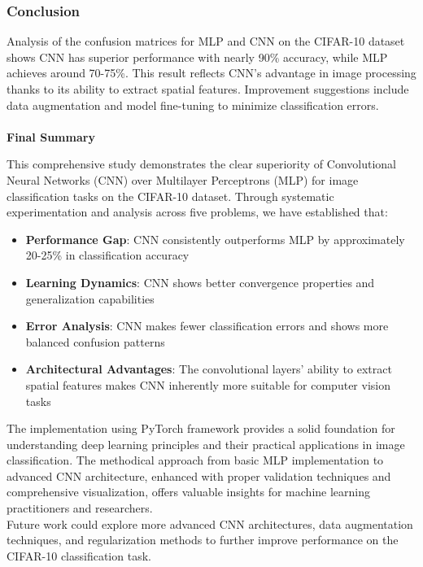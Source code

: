 \documentclass[12pt]{article}
\begin{document}
\subsubsection{Conclusion}

Analysis of the confusion matrices for MLP and CNN on the CIFAR-10 dataset shows 
CNN has superior performance with nearly 90\% accuracy, while MLP achieves around 
70-75\%. This result reflects CNN's advantage in image processing thanks to its 
ability to extract spatial features. Improvement suggestions include data 
augmentation and model fine-tuning to minimize classification errors.\\\\

\textbf{\Large{Final Summary}}

This comprehensive study demonstrates the clear superiority of Convolutional Neural 
Networks (CNN) over Multilayer Perceptrons (MLP) for image classification tasks on 
the CIFAR-10 dataset. Through systematic experimentation and analysis across five 
problems, we have established that:

\begin{itemize}
    \item \textbf{Performance Gap}: CNN consistently outperforms MLP by approximately 
    20-25\% in classification accuracy
    \item \textbf{Learning Dynamics}: CNN shows better convergence properties and 
    generalization capabilities
    \item \textbf{Error Analysis}: CNN makes fewer classification errors and shows 
    more balanced confusion patterns
    \item \textbf{Architectural Advantages}: The convolutional layers' ability to 
    extract spatial features makes CNN inherently more suitable for computer vision 
    tasks
\end{itemize}

The implementation using PyTorch framework provides a solid foundation for 
understanding deep learning principles and their practical applications in image 
classification. The methodical approach from basic MLP implementation to advanced 
CNN architecture, enhanced with proper validation techniques and comprehensive 
visualization, offers valuable insights for machine learning practitioners and 
researchers.\\

Future work could explore more advanced CNN architectures, data augmentation 
techniques, and regularization methods to further improve performance on the 
CIFAR-10 classification task.
\end{document}
